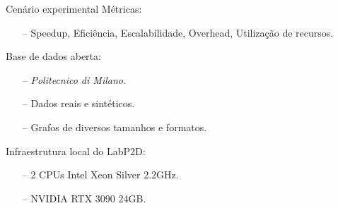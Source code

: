 \begin{frame}{Cenário experimental}
    Métricas:
    \begin{itemize}
        \item[--] Speedup, Eficiência, Escalabilidade, Overhead, Utilização de recursos.
    \end{itemize}

    Base de dados aberta:
    \begin{itemize}
        \item[--] \textit{Politecnico di Milano}.
        \item[--] Dados reais e sintéticos.
        \item[--] Grafos de diversos tamanhos e formatos.
    \end{itemize}

    Infraestrutura local do LabP2D:
    \begin{itemize}
        \item[--] 2 CPUs Intel Xeon Silver 2.2GHz.
        \item[--] NVIDIA RTX 3090 24GB.
    \end{itemize}
\end{frame}
